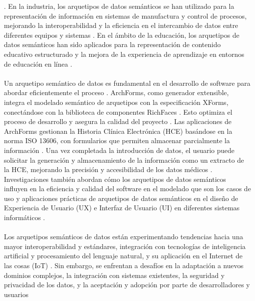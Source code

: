 \documentclass[12pt,a4paper]{article}
\begin{document}
\cite{Moner2018}
\cite{Alomari2020}
\cite{Rasmussen2014}
. En la industria, los arquetipos de datos semánticos se han utilizado para la representación de información en sistemas de manufactura y control de procesos, mejorando la interoperabilidad y la eficiencia en el intercambio de datos entre diferentes equipos y sistemas
\cite{Marco-Ruiz2015a}
. En el ámbito de la educación, los arquetipos de datos semánticos han sido aplicados para la representación de contenido educativo estructurado y la mejora de la experiencia de aprendizaje en entornos de educación en línea
\cite{Rasmussen2014}
\cite{CardosodeMoraes2016}
\cite{Baruch2017}
.
\\\\
Un arquetipo semántico de datos es fundamental en el desarrollo de software para abordar eficientemente el proceso
\cite{Stavrakos2016}
\cite{Kopanitsa2015a}
\cite{Piho2015}
. ArchForms, como generador extensible, integra el modelado semántico de arquetipos con la especificación XForms, conectándose con la biblioteca de componentes RichFaces
\cite{Piho2014}
\cite{Barbieri2013}
\cite{Menárguez-Tortosa2013}
. Esto optimiza el proceso de desarrollo y asegura la calidad del proyecto
\cite{MartínezCosta2011}
\cite{Martins1990}
\cite{Ward1987}
. Las aplicaciones de ArchForms gestionan la Historia Clínica Electrónica (HCE) basándose en la norma ISO 13606, con formularios que permiten almacenar parcialmente la información
\cite{Mittas2014}
\cite{Eklund2013}
\cite{Kosti2016}
. Una vez completada la introducción de datos, el usuario puede solicitar la generación y almacenamiento de la información como un extracto de la HCE, mejorando la precisión y accesibilidad de los datos médicos
\cite{Chuprina2017}
\cite{Giabbanelli2016}
\cite{Brunner2016}
. Investigaciones también abordan cómo los arquetipos de datos semánticos influyen en la eficiencia y calidad del software en el modelado que son los casos de uso y aplicaciones prácticas de arquetipos de datos semánticos en el diseño de Experiencia de Usuario (UX) e Interfaz de Usuario (UI) en diferentes sistemas informáticos
\cite{Sari2012}
\cite{Dobre2014}
\cite{Chuprina2015}
.
\\\\
Los arquetipos semánticos de datos están experimentando tendencias hacia una mayor interoperabilidad y estándares, integración con tecnologías de inteligencia artificial y procesamiento del lenguaje natural, y su aplicación en el Internet de las cosas (IoT)
\cite{Chuprina2016}
\cite{Ryabinin2015}
\cite{alonsobetanzos2016}
. Sin embargo, se enfrentan a desafíos en la adaptación a nuevos dominios complejos, la integración con sistemas existentes, la seguridad y privacidad de los datos, y la aceptación y adopción por parte de desarrolladores y usuarios
\end{document}
